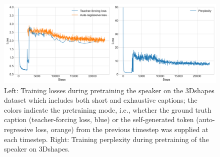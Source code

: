 \begin{figure}[h]
	\centering
	\includegraphics[width=\linewidth]{images/3dshapes_wShort_pretraining_losses_ppls.png}
	\caption{Left: Training losses during pretraining the speaker on the 3Dshapes dataset which includes both short and exhaustive captions; the colors indicate the pretraining mode, i.e., whether the ground truth caption (teacher-forcing loss, blue) or the self-generated token (auto-regressive loss, orange) from the previous timestep was supplied at each timestep. Right: Training perplexity during pretraining of the speaker on 3Dshapes.}
	\label{fig:3dshapes_pretraining_wShort}
\end{figure}  

